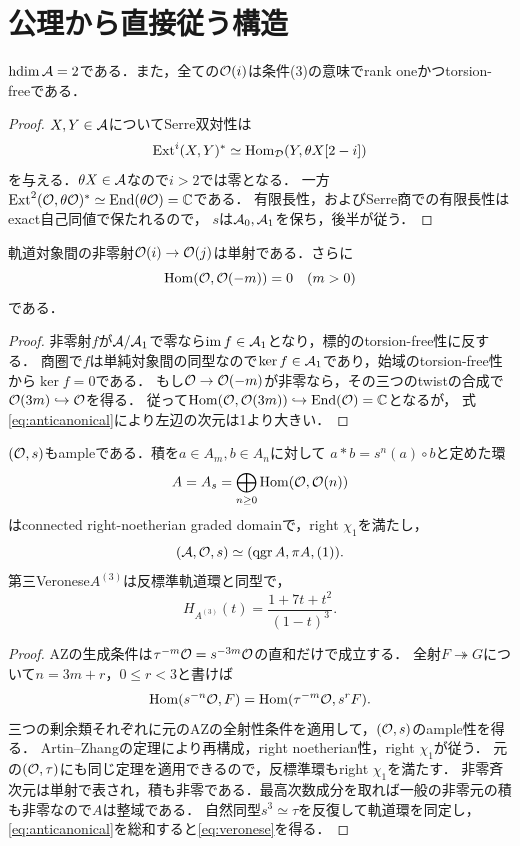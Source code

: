 \documentclass[11pt,a4paper]{ltjsarticle}
\begin{document}
\section{公理から直接従う構造}\label{sec:elementary}
\begin{lemma}\label{lem:dimension}
$\operatorname{hdim}\mathcal A=2$である．また，全ての$\mathcal O(i)$は条件(3)の意味でrank oneかつtorsion-freeである．
\end{lemma}
\begin{proof}
$X,Y\in\mathcal A$についてSerre双対性は
\[
 \operatorname{Ext}^i(X,Y)^*\simeq\operatorname{Hom}_{\mathcal D}(Y,\theta X[2-i])
\]
を与える．$\theta X\in\mathcal A$なので$i>2$では零となる．
一方$\operatorname{Ext}^2(\mathcal O,\theta\mathcal O)^*\simeq\operatorname{End}(\theta\mathcal O)=\mathbb C$である．
有限長性，およびSerre商での有限長性はexact自己同値で保たれるので，
$s$は$\mathcal A_0,\mathcal A_1$を保ち，後半が従う．
\end{proof}

\begin{lemma}\label{lem:mono}
軌道対象間の非零射$\mathcal O(i)\to\mathcal O(j)$は単射である．さらに
\begin{equation}\label{eq:negative}
 \operatorname{Hom}(\mathcal O,\mathcal O(-m))=0\quad(m>0)
\end{equation}
である．
\end{lemma}
\begin{proof}
非零射$f$が$\mathcal A/\mathcal A_1$で零なら$\operatorname{im}f\in\mathcal A_1$となり，標的のtorsion-free性に反する．
商圏で$f$は単純対象間の同型なので$\ker f\in\mathcal A_1$であり，始域のtorsion-free性から$\ker f=0$である．
もし$\mathcal O\to\mathcal O(-m)$が非零なら，その三つのtwistの合成で$\mathcal O(3m)\hookrightarrow\mathcal O$を得る．
従って$\operatorname{Hom}(\mathcal O,\mathcal O(3m))\hookrightarrow\operatorname{End}(\mathcal O)=\mathbb C$となるが，
式\eqref{eq:anticanonical}により左辺の次元は1より大きい．
\end{proof}

\begin{proposition}\label{prop:reconstruction}
$(\mathcal O,s)$もampleである．積を$a\in A_m,b\in A_n$に対して
$a*b=s^n(a)\circ b$と定めた環
\begin{equation}\label{eq:orbitring}
 A=A_s=\bigoplus_{n\geq0}\operatorname{Hom}(\mathcal O,\mathcal O(n))
\end{equation}
はconnected right-noetherian graded domainで，right $\chi_1$を満たし，
\[
 (\mathcal A,\mathcal O,s)\simeq(\operatorname{qgr} A,\pi A,(1)).
\]
第三Veronese$A^{(3)}$は反標準軌道環と同型で，
\begin{equation}\label{eq:veronese}
 H_{A^{(3)}}(t)=\frac{1+7t+t^2}{(1-t)^3}.
\end{equation}
\end{proposition}
\begin{proof}
AZの生成条件は$\tau^{-m}\mathcal O=s^{-3m}\mathcal O$の直和だけで成立する．
全射$F\twoheadrightarrow G$について$n=3m+r$，$0\leq r<3$と書けば
\[
 \operatorname{Hom}(s^{-n}\mathcal O,F)=\operatorname{Hom}(\tau^{-m}\mathcal O,s^rF).
\]
三つの剰余類それぞれに元のAZの全射性条件を適用して，$(\mathcal O,s)$のample性を得る．
Artin--Zhangの定理により再構成，right noetherian性，right $\chi_1$が従う．
元の$(\mathcal O,\tau)$にも同じ定理を適用できるので，反標準環もright $\chi_1$を満たす．
非零斉次元は単射で表され，積も非零である．最高次数成分を取れば一般の非零元の積も非零なので$A$は整域である．
自然同型$s^3\simeq\tau$を反復して軌道環を同定し，\eqref{eq:anticanonical}を総和すると\eqref{eq:veronese}を得る．
\end{proof}
\end{document}
